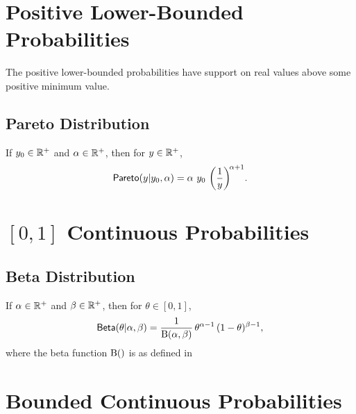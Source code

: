 \section{Positive Lower-Bounded Probabilities}

The positive lower-bounded probabilities have support on real values
above some positive minimum value.


\subsection{Pareto Distribution}

If $y_0 \in \mathbb{R}^+$ and $\alpha \in \mathbb{R}^+$, then for
$y \in \mathbb{R}^+$,
\[
\mbox{\sf Pareto}(y|y_0,\alpha)
=
\alpha 
\ y_0
\, \left( \frac{1}{y} \right)^{\!\alpha+1}
\! .
\]

\begin{description}
\end{description}



\section{$[0,1]$ Continuous Probabilities}

\subsection{Beta Distribution}

If $\alpha \in \mathbb{R}^+$ and $\beta \in \mathbb{R}^+$, then for $\theta
\in [0,1]$,
\[
\mbox{\sf Beta}(\theta|\alpha,\beta)
=
\frac{1}{\mbox{B}(\alpha,\beta)}
\,
\theta^{\alpha - 1}
\,
(1 - \theta)^{\beta - 1}
,
\] 
where the beta function $\mbox{B}()$ is as defined in 


\begin{description}
%
%
\end{description}

\section{Bounded Continuous Probabilities}

